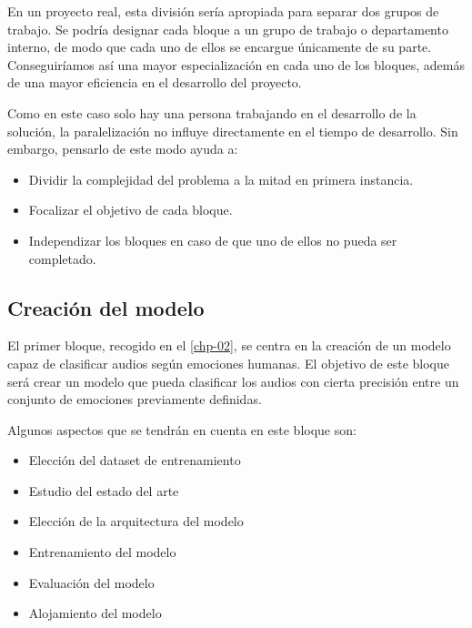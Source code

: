 En un proyecto real, esta división sería apropiada para separar dos grupos de trabajo.
Se podría designar cada bloque a un grupo de trabajo o departamento interno, de modo que cada uno de ellos se encargue únicamente de su parte.
Conseguiríamos así una mayor especialización en cada uno de los bloques, además de una mayor eficiencia en el desarrollo del proyecto.

Como en este caso solo hay una persona trabajando en el desarrollo de la solución, la paralelización no influye directamente en el tiempo de desarrollo.
Sin embargo, pensarlo de este modo ayuda a:

\begin{itemize}\itemsep1pt \parskip0pt 
    \item Dividir la complejidad del problema a la mitad en primera instancia.
    \item Focalizar el objetivo de cada bloque.
    \item Independizar los bloques en caso de que uno de ellos no pueda ser completado.
\end{itemize}

\medskip

\subsection{Creación del modelo}\label{sec:diseno-modelo}

El primer bloque, recogido en el \autoref{chp-02}, se centra en la creación de un modelo capaz de clasificar audios según emociones humanas.
El objetivo de este bloque será crear un modelo que pueda clasificar los audios con cierta precisión entre un conjunto de emociones previamente definidas.

Algunos aspectos que se tendrán en cuenta en este bloque son:
\begin{itemize}\itemsep1pt \parskip0pt 
    \item Elección del dataset de entrenamiento
    \item Estudio del estado del arte
    \item Elección de la arquitectura del modelo
    \item Entrenamiento del modelo
    \item Evaluación del modelo
    \item Alojamiento del modelo
\end{itemize}

\medskip


